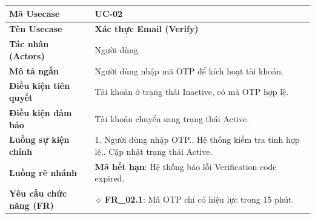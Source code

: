 \begin{table}[H]
\renewcommand{\arraystretch}{1.3}
\centering
\begin{tabularx}{\textwidth}{|p{4.5cm}|X|}
\hline
\cellcolor{gray!15}\bfseries Mã Usecase & \textbf{UC-02} \\ \hline
\cellcolor{gray!15}\bfseries Tên Usecase & \textbf{Xác thực Email (Verify)} \\ \hline
\cellcolor{gray!15}\bfseries Tác nhân (Actors) & Người dùng \\ \hline
\cellcolor{gray!15}\bfseries Mô tả ngắn & Người dùng nhập mã OTP để kích hoạt tài khoản. \\ \hline
\cellcolor{gray!15}\bfseries Điều kiện tiên quyết & Tài khoản ở trạng thái Inactive, có mã OTP hợp lệ. \\ \hline
\cellcolor{gray!15}\bfseries Điều kiện đảm bảo & Tài khoản chuyển sang trạng thái Active. \\ \hline
\cellcolor{gray!15}\bfseries Luồng sự kiện chính & 1. Người dùng nhập OTP.\newline 2. Hệ thống kiểm tra tính hợp lệ.\newline 3. Cập nhật trạng thái Active. \\ \hline
\cellcolor{gray!15}\bfseries Luồng rẽ nhánh & \textbf{Mã hết hạn}: Hệ thống báo lỗi Verification code expired. \\ \hline
\cellcolor{gray!15}\bfseries Yêu cầu chức năng (FR) & $\diamond$ \textbf{FR\_02.1}: Mã OTP chỉ có hiệu lực trong 15 phút. \\ \hline
\end{tabularx}
\end{table}

